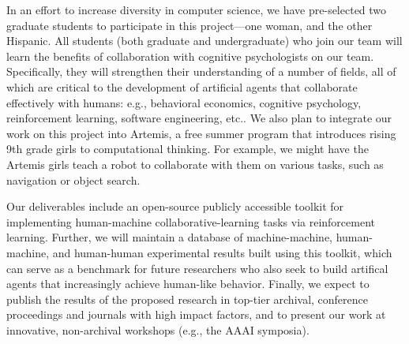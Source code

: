 In an effort to increase diversity in computer science, we have
pre-selected two graduate students to participate in this
project---one woman, and the other Hispanic.  All students (both
graduate and undergraduate) who join our team will learn the benefits
of collaboration with cognitive psychologists on our team.  Specifically, they will
strengthen their understanding of a number of fields, all of which are
critical to the development of artificial agents that collaborate
effectively with humans: e.g., behavioral economics, cognitive
psychology, reinforcement learning, software engineering, etc..
%
We also plan to integrate our work on this project into Artemis, a
free summer program that introduces rising 9th grade girls to
computational thinking.
For example, we might have the Artemis girls teach a robot to
collaborate with them on various tasks, such as navigation or object search.

Our deliverables include an open-source publicly accessible toolkit
for implementing human-machine collaborative-learning tasks via
reinforcement learning. Further, we will maintain a database of
machine-machine, human-machine, and human-human experimental results
built using this toolkit, which can serve as a benchmark for future
researchers who also seek to build artifical agents that increasingly
achieve human-like behavior.
%
Finally, we expect to publish the results of the proposed research in
top-tier archival, conference proceedings and journals with high
impact factors, and to present our work at innovative, non-archival
workshops (e.g., the AAAI symposia).

